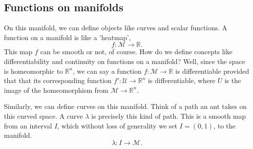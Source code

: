 \subsection{Functions on manifolds} 
On this manifold, we can define objects like curves and scalar functions.  A function on a manifold is like a 'heatmap', 
\[
	f : \mathcal{M} \rightarrow \mathbb{R}. 
\]
This map $f$ can be smooth or not, of course. How do we define concepts like differentiability and continuity on functions on a manifold? Well, since the space is homeomorphic to $\mathbb{R}^n$, we can say a function $f : \mathcal{M} \rightarrow \mathbb{R}$ is differentiable provided that that its corresponding function $f' : \mathcal{U} \rightarrow \mathbb{R}^n$ is differentiable, where $U$ is the image of the homeomorphism from $\mathcal{M} \rightarrow \mathbb{R}^n$. 

Similarly, we can define curves on this manifold. Think of a path an ant takes on this curved space. A curve $\lambda$ is precisely this kind of path. This is a smooth map from an interval $I$, which without loss of generality we set $I = (0, 1)$, to the manifold. 
\[ 
	\lambda : I \rightarrow \mathcal{M}. 
\]

